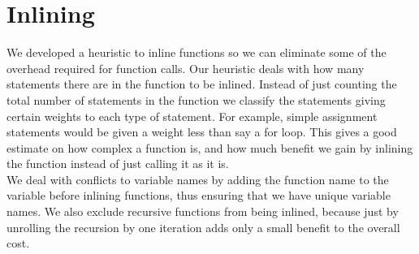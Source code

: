 \documentclass[aps,letterpaper,11pt]{revtex4}
\begin{document}
\section{Inlining}
We developed a heuristic to inline functions so we can eliminate some of the
overhead required for function calls. Our heuristic deals with how many
statements there are in the function to be inlined. Instead of just counting
the total number of statements in the function we classify the statements
giving certain weights to each type of statement. For example, simple
assignment statements would be given a weight less than say a for loop.
This gives a good estimate on how complex a function is, and how much
benefit we gain by inlining the function instead of just calling it as it
is. \\
We deal with conflicts to variable names by adding the function name to the
variable before inlining functions, thus ensuring that we have unique variable
names. We also exclude recursive functions from being inlined, because
just by unrolling the recursion by one iteration adds only a small benefit
to the overall cost.\\
\end{document}
